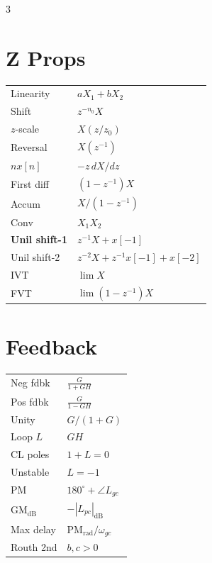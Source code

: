 \documentclass[11pt]{extarticle}
\begin{document}
\begin{paracol}{3}
\section*{Z Props}
\begin{tabular}{@{}l l@{}}
\toprule
Linearity & $aX_1{+}bX_2$ \\
Shift & $z^{-n_0}X$ \\
$z$-scale & $X(z/z_0)$ \\
Reversal & $X(z^{-1})$ \\
$nx[n]$ & $-z\,dX/dz$ \\
First diff & $(1{-}z^{-1})X$ \\
Accum & $X/(1{-}z^{-1})$ \\
Conv & $X_1X_2$ \\
\textbf{Unil shift-1} & $z^{-1}X{+}x[-1]$ \\
Unil shift-2 & $z^{-2}X{+}z^{-1}x[-1]{+}x[-2]$ \\
IVT & $\lim X$ \\
FVT & $\lim(1{-}z^{-1})X$ \\
\bottomrule
\end{tabular}

\vspace{6pt}
\section*{Feedback}
\begin{tabular}{@{}l l@{}}
\toprule
Neg fdbk & $\tfrac{G}{1{+}GH}$ \\
Pos fdbk & $\tfrac{G}{1{-}GH}$ \\
Unity & $G/(1{+}G)$ \\
Loop $L$ & $GH$ \\
CL poles & $1{+}L{=}0$ \\
Unstable & $L{=}{-}1$ \\
PM & $180^\circ{+}\angle L_{gc}$ \\
GM$_\mathrm{dB}$ & ${-}|L_{pc}|_\mathrm{dB}$ \\
Max delay & $\mathrm{PM}_\mathrm{rad}/\omega_{gc}$ \\
Routh 2nd & $b,c{>}0$ \\
\bottomrule
\end{tabular}

\vspace{6pt}

\end{paracol}
\end{document}
